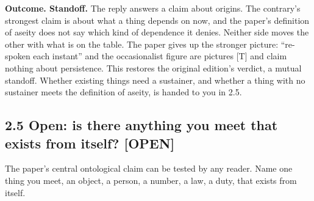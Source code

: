 \documentclass[11pt]{article}
\newcommand{\register}[1]{{\ttfamily\small #1}}
\begin{document}
\textbf{Outcome. Standoff.} The reply answers a claim about origins. The contrary's strongest claim is about what a thing depends on now, and the paper's definition of aseity does not say which kind of dependence it denies. Neither side moves the other with what is on the table. The paper gives up the stronger picture: ``re-spoken each instant'' and the occasionalist figure are pictures [T] and claim nothing about persistence. This restores the original edition's verdict, a mutual standoff. Whether existing things need a sustainer, and whether a thing with no sustainer meets the definition of aseity, is handed to you in 2.5.

\subsection*{2.5 Open: is there anything you meet that exists from itself? \register{[OPEN]}}

The paper's central ontological claim can be tested by any reader. Name one thing you meet, an object, a person, a number, a law, a duty, that exists from itself.
\end{document}
